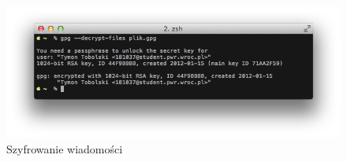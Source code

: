 \documentclass[wide,a4paper,titlepage,12pt] {article}
\begin{document}
  \begin{figure}[h!]
    \begin{center}
      \includegraphics[width=\textwidth]{img/15.png}
      \caption{Szyfrowanie wiadomości}
    \end{center}
  \end{figure}
\end{document}
